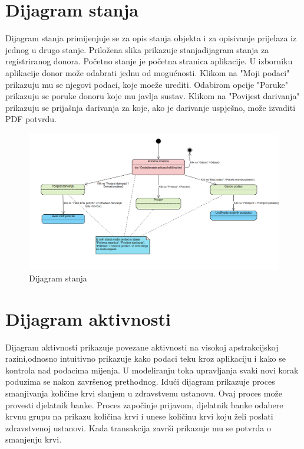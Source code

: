 \eject
			
			
		
		\section{Dijagram stanja}
			Dijagram stanja primijenjuje se za opis stanja objekta i za opisivanje prijelaza iz jednog u drugo stanje. Priložena slika prikazuje stanjadijagram stanja za registriranog donora. Početno stanje je početna stranica aplikacije. U izborniku aplikacije donor može odabrati jednu od mogućnosti. Klikom na "Moji podaci" prikazuju mu se njegovi podaci, koje moeže urediti. Odabirom opcije "Poruke" prikazuju se poruke donoru koje mu javlja sustav. Klikom na 
"Povijest darivanja" prikazuju se prijašnja darivanja za koje, ako je darivanje uspješno,  može izvaditi PDF potvrdu.

\begin{figure}[H]
	\centering
	\includegraphics[width=\textwidth, scale=0.7]{dijagrami/dijagram_stanja}
	\caption{Dijagram stanja}
	\label{fig:dijagram_stanja}
\end{figure}
			
			
			
			
			\eject 
		
		\section{Dijagram aktivnosti}
			Dijagram aktivnosti prikazuje povezane aktivnosti na visokoj apstrakcijskoj razini,odnosno intuitivno prikazuje kako podaci teku kroz aplikaciju i kako se
kontrola nad podacima mijenja. U modeliranju toka upravljanja svaki novi korak poduzima se nakon završenog prethodnog. Idući dijagram prikazuje proces smanjivanja količine krvi slanjem u zdravstvenu ustanovu. Ovaj proces može provesti djelatnik banke. Proces započinje prijavom, djelatnik banke odabere krvnu grupu na prikazu količina krvi i unese količinu krvi koju želi poslati zdravstvenoj ustanovi. Kada transakcija završi prikazuje mu se potvrda o smanjenju krvi.
		
